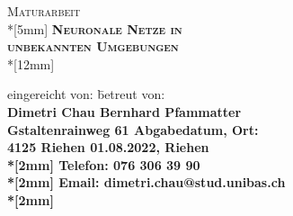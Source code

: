 \documentclass[a4paper,titlepage]{article}
\numberwithin{equation}{section} %
\begin{document}
\begin{titlepage}

\begin{center}

\end{center}
\vspace{2.5cm}
\begin{center}
        {\Large\scshape Maturarbeit}\\*[5mm]
        {\bf\Large\scshape Neuronale Netze in\\ unbekannten Umgebungen}\\*[12mm]
\end{center}
\vspace{4,5cm}
\newcommand{\titleleftmargin}{20mm}
\begin{tabbing}
       \hspace{\titleleftmargin}eingereicht von:		\hspace{6.5cm}\=			betreut von:\\
       \hspace{\titleleftmargin}\bf{Dimetri Chau} 								\> \bf{Bernhard Pfammatter}\\
       \hspace{\titleleftmargin}\textbf{Gstaltenrainweg 61}						\> Abgabedatum, Ort: \\
       \hspace{\titleleftmargin}\textbf{4125 Riehen}		   					\> \textbf{01.08.2022, Riehen}   \\*[2mm]
       \hspace{\titleleftmargin}Telefon: 076 306 39 90 \\*[2mm]
       \hspace{\titleleftmargin}Email: dimetri.chau@stud.unibas.ch\\*[2mm]
\end{tabbing}
\end{titlepage}


\newpage
\setcounter{page}{1}

\end{document}
